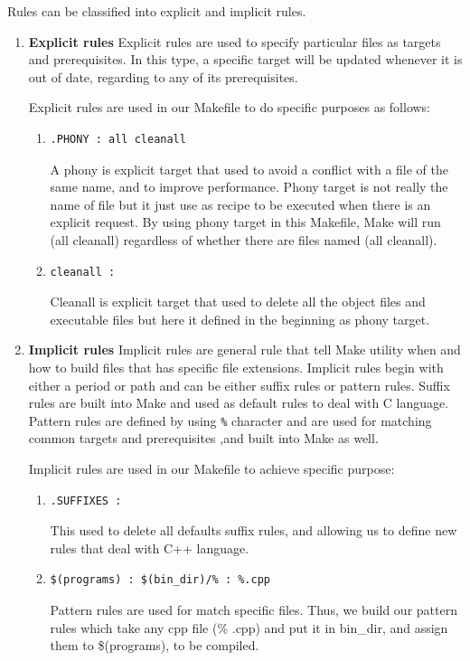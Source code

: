 \documentclass[11pt]{report}
\begin{document}
\begin{enumerate}
Rules can be classified into explicit and implicit rules. 
\begin{enumerate}
\item \textbf{Explicit rules} Explicit rules are used to specify particular files as targets and prerequisites. In this type, a specific target will be updated whenever it is out of date, regarding to any of its prerequisites.

Explicit rules are used in our Makefile to do specific purposes as follows:
\begin{enumerate}
\item \begin{verbatim}
.PHONY : all cleanall
\end{verbatim}
A phony is explicit target that used to avoid a conflict with a file of the same name, and to improve performance. Phony target is not really the name of file but it just use as recipe to be executed when there is an explicit request. By using phony target in this Makefile, Make will run (all cleanall) regardless of whether there are files named (all cleanall).

\item \begin{verbatim}
cleanall :
\end{verbatim}
Cleanall is explicit target that used to delete all the object files and executable files but here it defined in the beginning as phony target.
\end{enumerate}

\item \textbf{Implicit rules} Implicit rules are general rule that tell Make utility when and how to build files that has specific file extensions. Implicit rules begin with either a period or path and can be either suffix rules or pattern rules. Suffix rules are built into Make and used as default rules to deal with C language.  Pattern rules are defined by using \texttt{\%} character and are used for matching common targets and prerequisites ,and built into Make as well.

Implicit rules are used in our Makefile to achieve specific purpose:
\begin{enumerate}
\item \begin{verbatim}
.SUFFIXES :
\end{verbatim}
This used to delete all defaults suffix rules, and allowing us to define new rules that deal with C++ language.

\item \begin{verbatim}
$(programs) : $(bin_dir)/% : %.cpp
\end{verbatim}
Pattern rules are used for match specific files. Thus, we build our pattern rules which take any cpp file (\% .cpp) and put it in bin\_dir, and assign them to \$(programs), to be compiled.

\end{enumerate}
\end{enumerate}
\end{enumerate}
\end{document}
